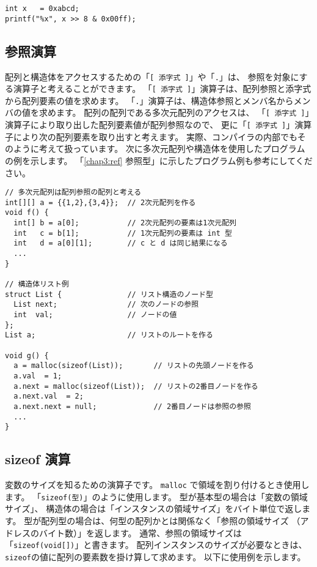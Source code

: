 \begin{mylist}
\begin{verbatim}
int x   = 0xabcd;
printf("%x", x >> 8 & 0x00ff);
\end{verbatim}
\end{mylist}

\subsection{参照演算}

配列と構造体をアクセスするための「\verb/[ 添字式 ]/」や「\verb/./」は、
参照を対象にする演算子と考えることができます。
「\verb/[ 添字式 ]/」演算子は、配列参照と添字式から配列要素の値を求めます。
「\verb/./」演算子は、構造体参照とメンバ名からメンバの値を求めます。
配列の配列である多次元配列のアクセスは、
「\verb/[ 添字式 ]/」演算子により取り出した配列要素値が配列参照なので、
更に「\verb/[ 添字式 ]/」演算子により次の配列要素を取り出すと考えます。
実際、\cmm コンパイラの内部でもそのように考えて扱っています。
次に多次元配列や構造体を使用したプログラムの例を示します。
「\ref{chap3:ref} 参照型」に示したプログラム例も参考にしてください。

\begin{mylist}
\begin{verbatim}
// 多次元配列は配列参照の配列と考える
int[][] a = {{1,2},{3,4}};  // 2次元配列を作る
void f() {
  int[] b = a[0];           // 2次元配列の要素は1次元配列
  int   c = b[1];           // 1次元配列の要素は int 型
  int   d = a[0][1];        // c と d は同じ結果になる
  ...
}

// 構造体リスト例
struct List {               // リスト構造のノード型
  List next;                // 次のノードの参照
  int  val;                 // ノードの値
};
List a;                     // リストのルートを作る

void g() {
  a = malloc(sizeof(List));       // リストの先頭ノードを作る
  a.val  = 1;
  a.next = malloc(sizeof(List));  // リストの2番目ノードを作る
  a.next.val  = 2;
  a.next.next = null;             // 2番目ノードは参照の参照
  ...
}
\end{verbatim}
\end{mylist}

\subsection{sizeof 演算}

変数のサイズを知るための演算子です。
\verb/malloc/ で領域を割り付けるとき使用します。
「\verb/sizeof(型)/」のように使用します。
型が基本型の場合は「変数の領域サイズ」、
構造体の場合は「インスタンスの領域サイズ」をバイト単位で返します。
型が配列型の場合は、何型の配列かとは関係なく「参照の領域サイズ
（アドレスのバイト数）」を返します。
通常、参照の領域サイズは「\verb/sizeof(void[])/」と書きます。
配列インスタンスのサイズが必要なときは、
\verb/sizeof/の値に配列の要素数を掛け算して求めます。
以下に使用例を示します。

